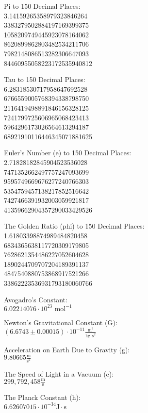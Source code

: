 \documentclass[12pt]{article}
\begin{document}
\twocolumn

Pi to 150 Decimal Places: 
\\ 3.14159265358979323846264
\\ 3383279502884197169399375
\\ 1058209749445923078164062
\\ 8620899862803482534211706
\\ 7982148086513282306647093
\\ 84460955058223172535940812
\bigskip

Tau to 150 Decimal Places:
\\ 6.28318530717958647692528
\\ 6766559005768394338798750
\\ 2116419498891846156328125
\\ 7241799725606965068423413
\\ 5964296173026564613294187
\\ 68921910116446345071881625
\bigskip

Euler's Number (e) to 150 Decimal Places:
\\ 2.71828182845904523536028
\\ 7471352662497757247093699
\\ 9595749669676277240766303
\\ 5354759457138217852516642
\\ 7427466391932003059921817
\\ 41359662904357290033429526
\bigskip

The Golden Ratio (phi) to 150 Decimal Places:
\\ 1.61803398874989484820458
\\ 6834365638117720309179805
\\ 7628621354486227052604628
\\ 1890244709707204189391137
\\ 4847540880753868917521266
\\ 33862223536931793180060766
\bigskip

Avogadro's Constant:
\\ \( 6.02214076 \cdot 10^{23} \text{ mol}^{-1} \)
\bigskip

Newton's Gravitational Constant (G):
\\ \( (6.6743 \pm 0.00015) \cdot 10^{-11} \frac{ \text{m}^3 }{ \text{kg s}^2 } \)
\bigskip

Acceleration on Earth Due to Gravity (g):
\\ \( 9.80665 \frac{ \text{m} }{ \text{s}^2 } \)
\bigskip

The Speed of Light in a Vacuum (c):
\\ \( 299,792,458 \frac{ \text{m} }{ \text{s} } \)
\bigskip

The Planck Constant (h):
\\ \( 6.62607015 \cdot 10^{-34} \text{J} \cdot \text{s} \)
\bigskip
\end{document}
